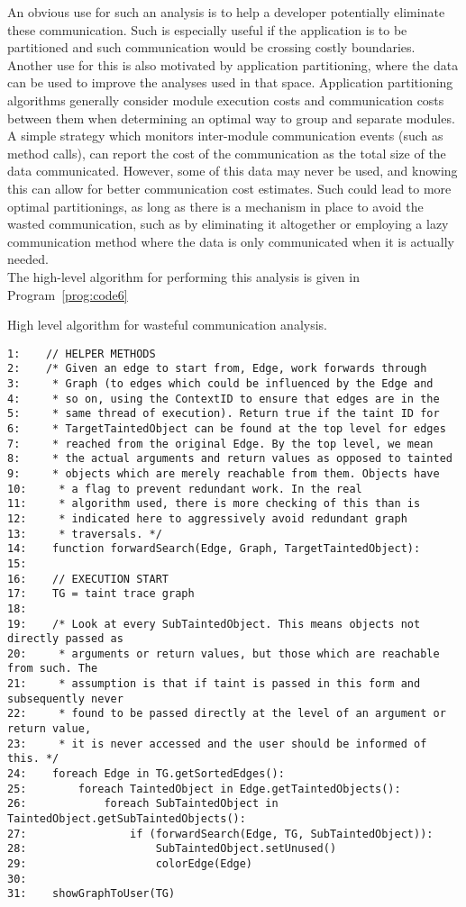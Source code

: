 \documentclass[msc,oneside]{ubcthesis}
\begin{document}
An obvious use for such an analysis is to help a developer potentially eliminate these communication. Such is especially useful if the application is to be partitioned and such communication would be crossing costly boundaries. Another use for this is also motivated by application partitioning, where the data can be used to improve the analyses used in that space. Application partitioning algorithms generally consider module execution costs and communication costs between them when determining an optimal way to group and separate modules. A simple strategy which monitors inter-module communication events (such as method calls), can report the cost of the communication as the total size of the data communicated. However, some of this data may never be used, and knowing this can allow for better communication cost estimates. Such could lead to more optimal partitionings, as long as there is a mechanism in place to avoid the wasted communication, such as by eliminating it altogether or employing a lazy communication method where the data is only communicated when it is actually needed.\\

The high-level algorithm for performing this analysis is given in Program~\ref{prog:code6}

\begin{Program}
  \caption{\label{prog:code6} High level algorithm for wasteful communication analysis.}
\begin{verbatim}			
1:    // HELPER METHODS
2:    /* Given an edge to start from, Edge, work forwards through
3:     * Graph (to edges which could be influenced by the Edge and
4:     * so on, using the ContextID to ensure that edges are in the
5:     * same thread of execution). Return true if the taint ID for
6:     * TargetTaintedObject can be found at the top level for edges
7:     * reached from the original Edge. By the top level, we mean 
8:     * the actual arguments and return values as opposed to tainted
9:     * objects which are merely reachable from them. Objects have 
10:     * a flag to prevent redundant work. In the real
11:     * algorithm used, there is more checking of this than is
12:     * indicated here to aggressively avoid redundant graph
13:     * traversals. */    
14:    function forwardSearch(Edge, Graph, TargetTaintedObject):
15:    
16:    // EXECUTION START
17:    TG = taint trace graph
18:    
19:    /* Look at every SubTaintedObject. This means objects not directly passed as
20:     * arguments or return values, but those which are reachable from such. The
21:     * assumption is that if taint is passed in this form and subsequently never
22:     * found to be passed directly at the level of an argument or return value, 
23:     * it is never accessed and the user should be informed of this. */   
24:    foreach Edge in TG.getSortedEdges():
25:        foreach TaintedObject in Edge.getTaintedObjects():
26:            foreach SubTaintedObject in TaintedObject.getSubTaintedObjects():
27:                if (forwardSearch(Edge, TG, SubTaintedObject)):
28:                    SubTaintedObject.setUnused()
29:                    colorEdge(Edge)
30:                    
31:    showGraphToUser(TG)
\end{verbatim}
\end{Program}
\end{document}
